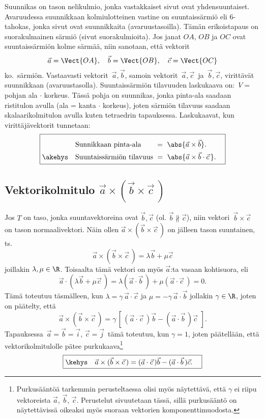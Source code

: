 Suunnikas on tason nelikulmio, jonka vastakkaiset sivut ovat yhdensuuntaiset. 
Avaruudessa suunnikkaan kolmiulotteinen vastine on suuntaissärmiö eli $6$-tahokas, jonka
sivut ovat suunnikkaita (avaruustasoilla). Tämän erikoistapaus on suorakulmainen särmiö
(sivut suorakulmioita). Jos janat $OA$, $OB$ ja $OC$ ovat suuntaissärmiön kolme särmää,
niin sanotaan, että vektorit
\[
\vec a=\Vect{OA}, \quad \vec b=\Vect{OB}, \quad \vec c=\Vect{OC}
\]
%
 ko.\ särmiön. Vastaavasti vektorit $\,\vec a,\vec b$, samoin vektorit
$\,\vec a,\vec c\,$ ja $\,\vec b,\vec c$, virittävät suunnikkaan (avaruustasolla).
Suuntaissärmiön tilavuuden laskukaava on: $\,V=$ pohjan ala $\cdot$ korkeus. Tässä pohja on
suunnikas, jonka pinta-ala saadaan ristitulon avulla (ala = kanta $\cdot$ korkeus), joten 
särmiön tilavuus saadaan skalaarikolmitulon avulla kuten tetraedrin tapauksessa. Laskukaavat,
kun virittäjävektorit tunnetaan:
\[
\boxed{ \begin{aligned}
\rule{0mm}{5mm}\quad &\text{Sunnikkaan pinta-ala} \qquad =\ \abs{\vec a \times \vec b}. \\
\akehys\quad &\text{Suuntaissärmiön tilavuus}\   
                   =\ \abs{\vec a \times \vec b \cdot \vec c\,}. \quad
        \end{aligned} }
\]

\subsection*{Vektorikolmitulo $\vec a \times (\vec b \times \vec c\,)$}
\index{vektorikolmitulo|vahv}

Jos $T$ on taso, jonka suuntavektoreina ovat $\vec b, \vec c$ (ol. $\vec b \nparallel \vec c$),
niin vektori $\,\vec b \times \vec c\,$ on tason normaalivektori. Näin ollen 
$\vec a  \times(\vec b \times \vec c\,)$ on jälleen tason suuntainen, ts.
\[
\vec a  \times(\vec b \times \vec c\,) = \lambda \vec b + \mu \vec c
\]
joillakin $\lambda, \mu \in \R$. Toisaalta tämä vektori on myös $\vec a$:ta vasaan kohtisuora,
eli
\[
\vec a \cdot (\lambda \vec b + \mu \vec c\,) 
                     = \lambda (\vec a \cdot \vec b\,) + \mu(\vec a \cdot \vec c\,) = 0.
\]
Tämä toteutuu täsmälleen, kun $\lambda = \gamma\,\vec a \cdot \vec c$ ja 
$\mu = - \gamma\,\vec a \cdot \vec b$ jollakin $\gamma \in \R$, joten on päätelty, että
\[
\vec a \times (\vec b \times \vec c\,) 
             = \gamma\,[\,(\vec a \cdot \vec c\,)\vec b - (\vec a \cdot \vec b\,)\vec c\,\,].
\]
Tapauksessa $\,\vec a = \vec b = \vec i$, $\vec c = \vec j\,$ tämä toteutuu, kun $\gamma=1$,
joten päätellään, että vektorikolmitulolle pätee purkukaava\footnote[2]{Purkusääntöä tarkemmin
perusteltaessa olisi myös näytettävä, että  $\gamma$ ei riipu vektoreista $\vec a$, $\vec b$,
$\vec c$. Perustelut sivuutetaan tässä, sillä purkusääntö on näytettävissä oikeaksi myös
suoraan vektorien komponenttimuodosta.}
\[
\boxed{\kehys\quad \vec a \times (\vec b \times \vec c\,)
                    =(\vec a \cdot \vec c\,)\vec b - (\vec a \cdot \vec b\,)\vec c. \quad}
\]

